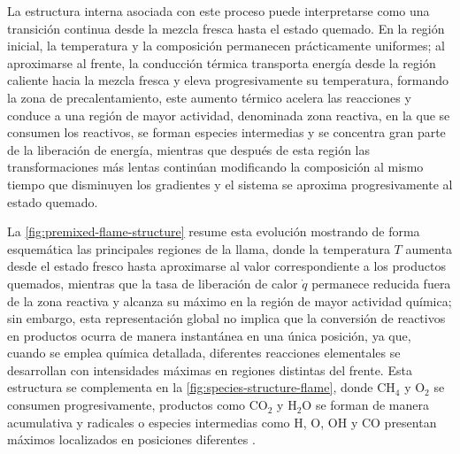 \documentclass[12pt,a4paper,twoside,openany]{book}
\begin{document}
La estructura interna asociada con este proceso puede interpretarse como una
transición continua desde la mezcla fresca hasta el estado quemado. En la región
inicial, la temperatura y la composición permanecen prácticamente uniformes;
al aproximarse al frente, la conducción térmica transporta energía desde la
región caliente hacia la mezcla fresca y eleva progresivamente su temperatura,
formando la zona de precalentamiento, este aumento térmico acelera las
reacciones y conduce a una región de mayor actividad, denominada zona reactiva,
en la que se consumen los reactivos, se forman especies intermedias y se
concentra gran parte de la liberación de energía, mientras que después de esta
región las transformaciones más lentas continúan modificando la composición al
mismo tiempo que disminuyen los gradientes y el sistema se aproxima
progresivamente al estado quemado.

La \cref{fig:premixed-flame-structure} resume esta evolución mostrando de forma
esquemática las principales regiones de la llama, donde la temperatura \(T\)
aumenta desde el estado fresco hasta aproximarse al valor correspondiente a los
productos quemados, mientras que la tasa de liberación de calor \(\dot q\)
permanece reducida fuera de la zona reactiva y alcanza su máximo en la región de
mayor actividad química; sin embargo, esta representación global no implica que
la conversión de reactivos en productos ocurra de manera instantánea en una
única posición, ya que, cuando se emplea química detallada, diferentes
reacciones elementales se desarrollan con intensidades máximas en regiones
distintas del frente. Esta estructura se complementa en la
\cref{fig:species-structure-flame}, donde \(\mathrm{CH_4}\) y
\(\mathrm{O_2}\) se consumen progresivamente, productos como
\(\mathrm{CO_2}\) y \(\mathrm{H_2O}\) se forman de manera acumulativa y
radicales o especies intermedias como \(\mathrm{H}\), \(\mathrm{O}\),
\(\mathrm{OH}\) y CO presentan máximos localizados en posiciones diferentes
\cite{Peters1984,Smooke1991}.
\end{document}
